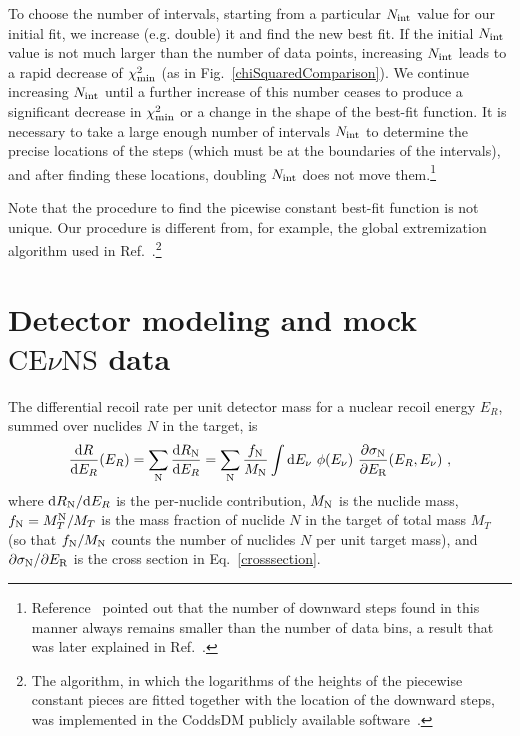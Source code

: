 \documentclass[a4paper,11pt]{article}
\renewcommand\({\left(}
\renewcommand\){\right)}
\renewcommand\[{\left[}
\renewcommand\]{\right]}
\newcommand{\tx}{\text}
\newcommand{\df}{\text{d}}
\newcommand{\al}[1]{\begin{align}#1\end{align}}
\newcommand{\paren}[1]{\left(#1\right)}
\newcommand{\fn}[1]{\!\paren{#1}} %
\newcommand{\p}{\partial}
\theoremstyle{definition}
\newcommand{\ov}{\over}
\newcommand{\CEnNS}{\text{CE}\nu\text{NS}}
\begin{document}
To choose the number of intervals, starting from a particular $N_{\rm int}$ value for our initial fit, 
we increase (e.g. double) it and find the new best fit.  If the initial $N_{\rm int}$ value is not much larger than the number of data points, increasing $N_{\rm int}$ leads to a rapid decrease of $\chi^2_{\rm min}$ (as in Fig.~\ref{chiSquaredComparison}). We continue increasing $N_{\rm int}$
 until a further increase of this number ceases to produce a significant decrease in $\chi^2_{\rm min}$ or a change in the shape of the best-fit function. It is necessary to take a large enough number of intervals $N_{\rm int}$ to determine the precise locations of the steps (which must be at the boundaries of the intervals), and after finding these locations, doubling $N_{\rm int}$ does not move them.\footnote{Reference~\cite{Feldstein:2014gza} pointed out that the number of downward steps found in this manner always remains smaller than the number of data bins, a result that was later explained in  Ref.~\cite{Gelmini:2017aqe}.} 

Note that the procedure to find the picewise constant best-fit function is not unique. Our procedure is different from, for example, the global extremization algorithm used in Ref.~\cite{Gelmini:2015voa}.\footnote{The algorithm, in which the logarithms of the heights of the piecewise constant pieces  are fitted together with the location of the downward steps, was implemented in the CoddsDM publicly available software~\cite{Georgescu:CoddsDM}.} 


\section{Detector modeling and mock $\CEnNS$ data}
\label{Sec:CEvNS-rate}

The differential recoil rate per unit detector mass for a nuclear recoil energy $E_R$, summed over nuclides $N$ in the target, is
\al{
    {\df R\ov \df E_R}\fn{E_R} = \sum_\tx{N} {\df R_{\rm N} \ov \df E_R }= \sum_\tx{N} {f_{\rm N}\ov M_{\rm N}}\int \df E_\nu~\phi\fn{E_\nu}\,{\p \sigma_{\rm N}\ov \p E_\text{R}}\fn{E_R, E_\nu}\,,
\label{eq:dR-dER}
}
where $\df R_{\rm N}/\df E_R$ is the per-nuclide contribution, $M_{\rm N}$ is the nuclide mass,  $f_{\rm N} = M^{\rm N}_T/M_T$ is the mass fraction of nuclide $N$ in the target of total mass $M_T$ (so that $f_{\rm N}/M_{\rm N}$ counts the number of  nuclides $N$ per unit target mass), and $\partial \sigma_{\rm N}/\partial E_{\rm R}$ is the cross section in Eq.~\eqref{crosssection}.
\end{document}

